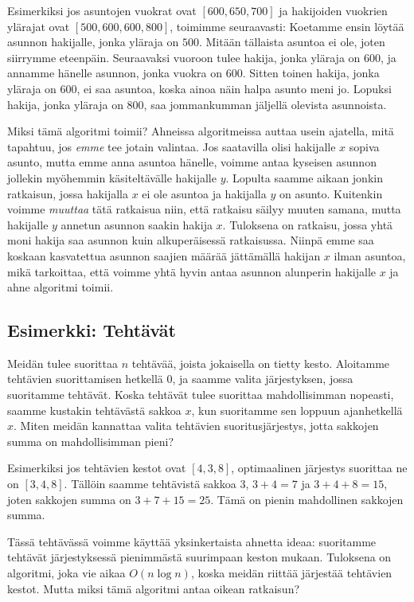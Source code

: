 Esimerkiksi jos asuntojen vuokrat ovat $[600,650,700]$
ja hakijoiden vuok\-rien ylärajat ovat $[500,600,600,800]$,
toimimme seuraavasti:
Koetamme ensin löytää asunnon hakijalle,
jonka yläraja on $500$.
Mitään tällaista asuntoa ei ole, joten siirrymme eteenpäin.
Seuraavaksi vuoroon tulee hakija, jonka yläraja on $600$,
ja annamme hänelle asunnon, jonka vuokra on $600$.
Sitten toinen hakija, jonka yläraja on $600$,
ei saa asuntoa, koska ainoa näin halpa asunto meni jo.
Lopuksi hakija, jonka yläraja on $800$,
saa jommankumman jäljellä olevista asunnoista.

Miksi tämä algoritmi toimii?
Ahneissa algoritmeissa auttaa usein ajatella,
mitä tapahtuu, jos \emph{emme} tee jotain valintaa.
Jos saatavilla olisi hakijalle $x$ sopiva asunto,
mutta emme anna asuntoa hänelle,
voimme antaa kyseisen asunnon jollekin
myöhemmin käsiteltävälle hakijalle $y$.
Lopulta saamme aikaan jonkin ratkaisun, jossa
hakijalla $x$ ei ole asuntoa ja hakijalla $y$ on asunto.
Kuitenkin voimme \emph{muuttaa} tätä ratkaisua niin,
että ratkaisu säilyy muuten samana, mutta hakijalle $y$
annetun asunnon saakin hakija $x$.
Tuloksena on ratkaisu, jossa yhtä moni hakija
saa asunnon kuin alkuperäisessä ratkaisussa.
Niinpä emme saa koskaan kasvatettua asunnon saajien määrää
jättämällä hakijan $x$ ilman asuntoa,
mikä tarkoittaa, että voimme yhtä hyvin antaa asunnon alunperin
hakijalle $x$ ja ahne algoritmi toimii.

\subsection{Esimerkki: Tehtävät}

Meidän tulee suorittaa $n$ tehtävää,
joista jokaisella on tietty kesto.
Aloitamme tehtävien suorittamisen hetkellä 0,
ja saamme valita järjestyksen, jossa suoritamme tehtävät.
Koska tehtävät tulee suorittaa mahdollisimman nopeasti,
saamme kustakin tehtävästä sakkoa $x$,
kun suoritamme sen loppuun ajanhetkellä $x$.
Miten meidän kannattaa valita tehtävien suoritusjärjestys,
jotta sakkojen summa on mahdollisimman pieni?

Esimerkiksi jos tehtävien kestot ovat $[4,3,8]$,
optimaalinen järjestys suorittaa ne on $[3,4,8]$.
Tällöin saamme tehtävistä sakkoa $3$, $3+4=7$ ja $3+4+8=15$,
joten sakkojen summa on $3+7+15=25$.
Tämä on pienin mahdollinen sakkojen summa.

Tässä tehtävässä voimme käyttää yksinkertaista ahnetta ideaa:
suoritamme tehtävät järjestyksessä pienimmästä suurimpaan
keston mukaan.
Tuloksena on algoritmi, joka vie aikaa $O(n \log n)$,
koska meidän riittää järjestää tehtävien kestot.
Mutta miksi tämä algoritmi antaa oikean ratkaisun?

